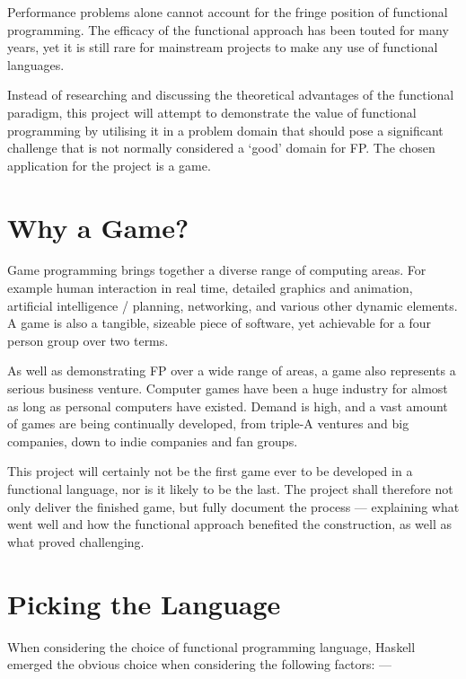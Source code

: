 Performance problems alone cannot account for the fringe position of functional programming. The efficacy of the functional approach has been touted for many years, yet it is still rare for mainstream projects to make any use of functional languages.

Instead of researching and discussing the theoretical advantages of the functional paradigm, this project will attempt to demonstrate the value of functional programming by utilising it in a problem domain that should pose a significant challenge that is not normally considered a `good' domain for FP. The chosen application for the project is a game.

\section{Why a Game?}

Game programming brings together a diverse range of computing areas. For example human interaction in real time, detailed graphics and animation, artificial intelligence / planning, networking, and various other dynamic elements. A game is also a tangible, sizeable piece of software, yet achievable for a four person group over two terms.

As well as demonstrating FP over a wide range of areas, a game also represents a serious business venture.\cite{essentialFacts2012} Computer games have been a huge industry for almost as long as personal computers have existed. Demand is high, and a vast amount of games are being continually developed, from triple-A ventures and big companies, down to indie companies and fan groups.

This project will certainly not be the first game ever to be developed in a functional language, nor is it likely to be the last. The project shall therefore not only deliver the finished game, but fully document the process --- explaining what went well and how the functional approach benefited the construction, as well as what proved challenging.

\section{Picking the Language}

When considering the choice of functional programming language, Haskell emerged the obvious choice when considering the following factors: ---

